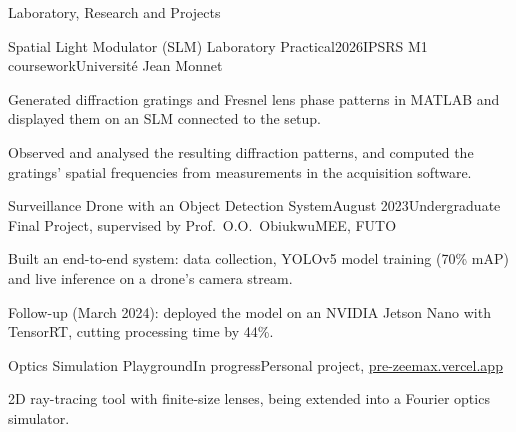 \documentclass{resume}
\begin{document}
\begin{rSection}{Laboratory, Research and Projects}

\begin{rSubsection}{Spatial Light Modulator (SLM) Laboratory Practical}{2026}{IPSRS M1 coursework}{Université Jean Monnet}
\item Generated diffraction gratings and Fresnel lens phase patterns in MATLAB and displayed them on an SLM connected to the setup.
\item Observed and analysed the resulting diffraction patterns, and computed the gratings' spatial frequencies from measurements in the acquisition software.
\end{rSubsection}

\begin{rSubsection}{Surveillance Drone with an Object Detection System}{August 2023}{Undergraduate Final Project, supervised by Prof.\ O.O.\ Obiukwu}{MEE, FUTO}
\item Built an end-to-end system: data collection, YOLOv5 model training (70\% mAP) and live inference on a drone's camera stream.
\item Follow-up (March 2024): deployed the model on an NVIDIA Jetson Nano with TensorRT, cutting processing time by 44\%.
\end{rSubsection}

\begin{rSubsection}{Optics Simulation Playground}{In progress}{Personal project, \href{https://pre-zeemax.vercel.app/}{pre-zeemax.vercel.app}}{}
\item 2D ray-tracing tool with finite-size lenses, being extended into a Fourier optics simulator.
\end{rSubsection}

\end{rSection}
\end{document}
